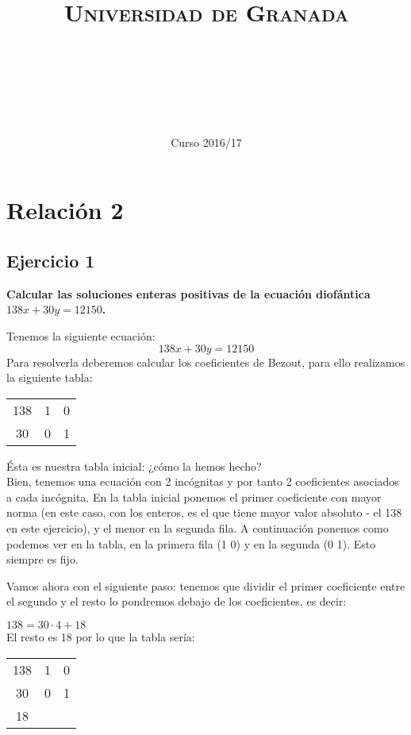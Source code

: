 \documentclass[11pt, a4paper, titlepage]{article}
\title{
  \normalfont \normalsize 
  \textsc{Universidad de Granada} \\ [25pt]    %
  \horrule{0.5pt} \\[0.4cm] %
  \huge \subject\\ %
  \horrule{2pt} \\[0.5cm] %
}
\author{\Large{\docauthor}}
\date{\vspace{-1.5em} \normalsize Curso 2016/17}
\begin{document}
\maketitle

\section{\Huge{Relación 2}}

\subsection{\LARGE{Ejercicio 1}}

\textbf{Calcular las soluciones enteras positivas de la ecuación diofántica $ 138x + 30y = 12150 $.}

Tenemos la siguiente ecuación: $$ 138x + 30y = 12150 $$ Para resolverla deberemos calcular los coeficientes de Bezout, para ello realizamos la siguiente tabla:

\begin{center}
	\begin{tabular}{c|cc}
138 & 1 & 0 \\
30 & 0 & 1 \\
\end{tabular}

\end{center}
Ésta es nuestra tabla inicial: ¿cómo la hemos hecho? \\
Bien, tenemos una ecuación con 2 incógnitas y por tanto 2 coeficientes asociados a cada incógnita. En la tabla inicial ponemos el primer coeficiente con mayor norma (en este caso, con los enteros, es el que tiene mayor valor absoluto - el 138 en este ejercicio), y el menor en la segunda fila. A continuación ponemos como podemos ver en la tabla, en la primera fila (1 0) y en la segunda (0 1). Esto siempre es fijo.

Vamos ahora con el siguiente paso: tenemos que dividir el primer coeficiente entre el segundo y el resto lo pondremos debajo de los coeficientes, es decir:

$ 138 = 30 \cdot 4 + 18 $ \\
El resto es 18 por lo que la tabla sería:


\begin{center}
\begin{tabular}{c|cc}
138 & 1 & 0 \\
30 & 0 & 1 \\
\hline
18 \\
\end{tabular}
\end{center}
\end{document}
